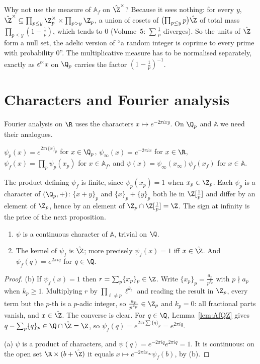 \begin{think}
Why not use the measure of $\mathbb{A}_f$ on $\hat{\Z}^\times$? Because it sees nothing: for every $y$, $\hat{\Z}^\times\subseteq\prod_{p\le y}\Z_p^\times\times\prod_{p>y}\Z_p$, a union of cosets of
$\bigl(\prod_{p\le y}p\bigr)\hat{\Z}$ of total mass $\prod_{p\le y}(1-\frac1p)$, which tends to $0$ (Volume~5: $\sum\frac1p$ diverges). So the units of
$\hat{\Z}$ form a null set, the adelic version of ``a random integer is coprime to every prime with probability $0$''. The multiplicative
measure has to be normalised separately, exactly as $\dd^\times x$ on $\Q_p$ carries the factor $(1-\frac1p)^{-1}$.
\end{think}

\section{Characters and Fourier analysis}

Fourier analysis on $\R$ uses the characters $x\mapsto e^{-2\pi ixy}$. On $\Q_p$ and $\mathbb{A}$ we need their analogues.

\begin{definition}
$\psi_p(x)=e^{2\pi i\{x\}_p}$ for $x\in\Q_p$, \quad $\psi_\infty(x)=e^{-2\pi ix}$ for $x\in\R$, \quad
$\psi_f(x)=\prod_p\psi_p(x_p)$ for $x\in\mathbb{A}_f$, \quad and $\psi(x)=\psi_\infty(x_\infty)\psi_f(x_f)$ for $x\in\mathbb{A}$.
\end{definition}

The product defining $\psi_f$ is finite, since $\psi_p(x_p)=1$ when $x_p\in\Z_p$. Each $\psi_p$ is a character of $(\Q_p,+)$: $\{x+y\}_p$
and $\{x\}_p+\{y\}_p$ both lie in $\Z[\frac1p]$ and differ by an element of $\Z_p$, hence by an element of $\Z_p\cap\Z[\frac1p]=\Z$. The sign
at infinity is the price of the next proposition.

\begin{proposition}\label{prop:psiQ}
\begin{enumerate}[label=(\alph*)]
\item $\psi$ is a continuous character of $\mathbb{A}$, trivial on $\Q$.
\item The kernel of $\psi_f$ is $\hat{\Z}$; more precisely $\psi_f(x)=1$ iff $x\in\hat{\Z}$. And $\psi_f(q)=e^{2\pi iq}$ for $q\in\Q$.
\end{enumerate}
\end{proposition}
\begin{proof}
(b) If $\psi_f(x)=1$ then $r=\sum_p\{x_p\}_p\in\Z$. Write $\{x_p\}_p=\frac{a_p}{p^{k_p}}$ with $p\nmid a_p$ when $k_p\ge1$. Multiplying
$r$ by $\prod_{\ell\ne p}\ell^{k_\ell}$ and reading the result in $\Z_p$, every term but the $p$-th is a $p$-adic integer, so
$\frac{a_p}{p^{k_p}}\in\Z_p$ and $k_p=0$: all fractional parts vanish, and $x\in\hat{\Z}$. The converse is clear. For $q\in\Q$,
Lemma~\ref{lem:AfQZ} gives $q-\sum_p\{q\}_p\in\Q\cap\hat{\Z}=\Z$, so $\psi_f(q)=e^{2\pi i\sum\{q\}_p}=e^{2\pi iq}$.

(a) $\psi$ is a product of characters, and $\psi(q)=e^{-2\pi iq}e^{2\pi iq}=1$. It is continuous: on the open set $\R\times(b+\hat{\Z})$ it
equals $x\mapsto e^{-2\pi ix_\infty}\psi_f(b)$, by (b).
\end{proof}

